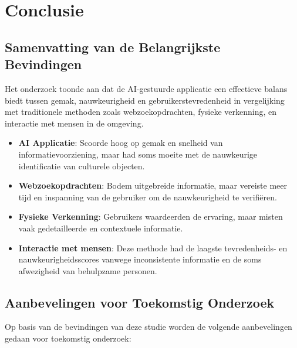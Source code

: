 
\chapter{Conclusie}%
\label{ch:conclusie}


\section{Samenvatting van de Belangrijkste Bevindingen}
Het onderzoek toonde aan dat de AI-gestuurde applicatie een effectieve balans biedt tussen gemak, nauwkeurigheid en gebruikerstevredenheid in vergelijking met traditionele methoden zoals webzoekopdrachten, fysieke verkenning, en interactie met mensen in de omgeving.

\begin{itemize}
    \item \textbf{AI Applicatie}: Scoorde hoog op gemak en snelheid van informatievoorziening, maar had soms moeite met de nauwkeurige identificatie van culturele objecten.
    \item \textbf{Webzoekopdrachten}: Bodem uitgebreide informatie, maar vereiste meer tijd en inspanning van de gebruiker om de nauwkeurigheid te verifiëren.
    \item \textbf{Fysieke Verkenning}: Gebruikers waardeerden de ervaring, maar misten vaak gedetailleerde en contextuele informatie.
    \item \textbf{Interactie met mensen}: Deze methode had de laagste tevredenheids- en nauwkeurigheidsscores vanwege inconsistente informatie en de soms afwezigheid van behulpzame personen.
\end{itemize}

\pagebreak

\section{Aanbevelingen voor Toekomstig Onderzoek}
Op basis van de bevindingen van deze studie worden de volgende aanbevelingen gedaan voor toekomstig onderzoek:

